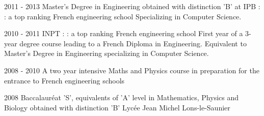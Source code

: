 \cventry
{2011 - 2013}
{Master's Degree in Engineering}
{obtained with distinction 'B' at IPB :  : a top ranking French engineering school}
{}
{}
{	
	Specializing in Computer Science.\\
}


\cventry
{2010 - 2011}
{INPT :  : a top ranking French engineering school}
{}
{}
{}
{
	First year of a 3-year degree  course leading to a French Diploma in Engineering. Equivalent to Master's Degree in Engineering
	specializing in Computer Science.
}

\cventry
{2008 - 2010}
{A two year intensive Maths and Physics course in preparation for the entrance
to French engineering schools}
{}
{}
{}
{}

\cventry
{2008}
{Baccalauréat 'S', equivalents of 'A' level in Mathematics, Physics and Biology obtained with distinction 'B'}
{Lycée Jean Michel}
{Lons-le-Saunier}
{}
{}

